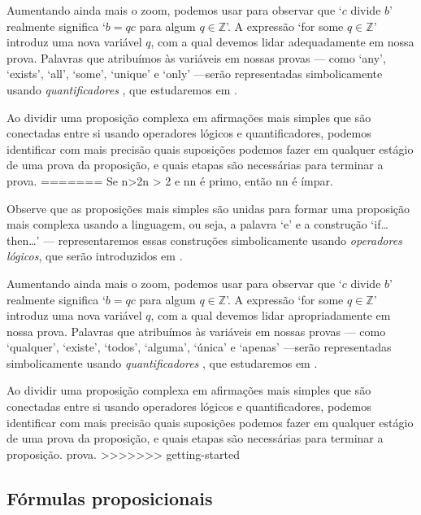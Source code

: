 \begin{center}
Aumentando ainda mais o zoom, podemos usar  para observar que `$c$ divide $b$' realmente significa `$b = qc$ para algum $q \in \mathbb{Z}$'. A expressão `for some $q \in \mathbb{Z}$' introduz uma nova variável $q$, com a qual devemos lidar adequadamente em nossa prova. Palavras que atribuímos às variáveis ​​em nossas provas --- como `any', `exists', `all', `some', `unique' e `only' ---serão representadas simbolicamente usando \textit{quantificadores} , que estudaremos em .

Ao dividir uma proposição complexa em afirmações mais simples que são conectadas entre si usando operadores lógicos e quantificadores, podemos identificar com mais precisão quais suposições podemos fazer em qualquer estágio de uma prova da proposição, e quais etapas são necessárias para terminar a prova.
=======
Se n>2n > 2 e nn é primo, então nn é ímpar.
\end{center}

Observe que as proposições mais simples são unidas para formar uma proposição mais complexa usando a linguagem, ou seja, a palavra `e' e a construção `if\dots{} then\dots{}' --- representaremos essas construções simbolicamente usando \textit {operadores lógicos}, que serão introduzidos em .

Aumentando ainda mais o zoom, podemos usar  para observar que `$c$ divide $b$' realmente significa `$b = qc$ para algum $q \in \mathbb{Z}$'. A expressão `for some $q \in \mathbb{Z}$' introduz uma nova variável $q$, com a qual devemos lidar apropriadamente em nossa prova. Palavras que atribuímos às variáveis ​​em nossas provas --- como `qualquer', `existe', `todos', `alguma', `única' e `apenas' ---serão representadas simbolicamente usando \textit{quantificadores} , que estudaremos em .

Ao dividir uma proposição complexa em afirmações mais simples que são conectadas entre si usando operadores lógicos e quantificadores, podemos identificar com mais precisão quais suposições podemos fazer em qualquer estágio de uma prova da proposição, e quais etapas são necessárias para terminar a proposição. prova.
>>>>>>> getting-started

\subsection*{Fórmulas proposicionais}

